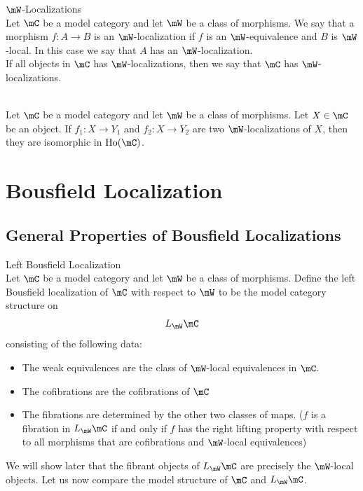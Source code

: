 \documentclass[a4paper]{article}
\begin{document}
\begin{defn}{$\mW$-Localizations}{}\\ Let $\mC$ be a model category and let $\mW$ be a class of morphisms. We say that a morphism $f:A\to B$ is an $\mW$-localization if $f$ is an $\mW$-equivalence and $B$ is $\mW$-local. In this case we say that $A$ has an $\mW$-localization. \\

If all objects in $\mC$ has $\mW$-localizations, then we say that $\mC$ has $\mW$-localizations. 
\end{defn}

\begin{prp}{}{}\\ Let $\mC$ be a model category and let $\mW$ be a class of morphisms. Let $X\in\mC$ be an object. If $f_1:X\to Y_1$ and $f_2:X\to Y_2$ are two $\mW$-localizations of $X$, then they are isomorphic in $\text{Ho}(\mC)$. 
\end{prp}

\pagebreak
\section{Bousfield Localization}
\subsection{General Properties of Bousfield Localizations}
\begin{defn}{Left Bousfield Localization}{}\\ Let $\mC$ be a model category and let $\mW$ be a class of morphisms. Define the left Bousfield localization of $\mC$ with respect to $\mW$ to be the model category structure on $$L_\mW\mC$$ consisting of the following data: 
\begin{itemize}
\item The weak equivalences are the class of $\mW$-local equivalences in $\mC$. 
\item The cofibrations are the cofibrations of $\mC$
\item The fibrations are determined by the other two classes of maps. ($f$ is a fibration in $L_\mW\mC$ if and only if $f$ has the right lifting property with respect to all morphisms that are cofibrations and $\mW$-local equivalences)
\end{itemize}
\end{defn}

We will show later that the fibrant objects of $L_\mW\mC$ are precisely the $\mW$-local objects. Let us now compare the model structure of $\mC$ and $L_\mW\mC$. 
\end{document}
